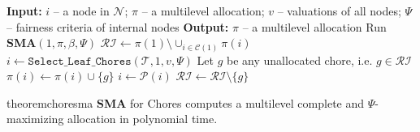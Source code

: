 \documentclass[]{article}
\newcommand{\tree}{\mathcal{T}}
\newcommand{\nodes}{\mathcal{N}}
\newcommand{\children}{\mathcal{C}}
\newcommand{\parent}{\mathcal{P}}
\begin{document}
\begin{algorithm}[] \small
\caption{\small SMA for Chores}
\label{algo:chore SMA}
\begin{algorithmic}[1]
    \State \textbf{Input:} $i$ -- a node in $\nodes$; $\pi $ -- a multilevel allocation; $v$ -- valuations of all nodes; $\Psi$ -- fairness criteria of internal nodes
    \State \textbf{Output:} $\pi $ -- a multilevel allocation
    \State Run \textbf{SMA}$(1, \pi, \beta, \Psi)$
    \State $\mathcal{RI} \gets \pi(1) \setminus \cup_{i \in \children(1)} \pi(i)$ 
        \State $i \gets \texttt{Select\_Leaf\_Chores}(\tree, 1, v, \Psi)$
        \State Let $g$ be any unallocated chore, i.e. $g \in \mathcal{RI}$
            \State $\pi(i) \gets \pi(i) \cup \{g\}$
            \State $i \gets \parent(i)$
        \EndWhile
        \State $\mathcal{RI} \gets \mathcal{RI} \setminus \{g\}$
    \EndWhile
\end{algorithmic}
\end{algorithm}

\begin{restatable}{theorem}{choresma}
    \textbf{SMA} for Chores computes a multilevel complete and $\Psi$-maximizing allocation in polynomial time.
\end{restatable}
\end{document}

